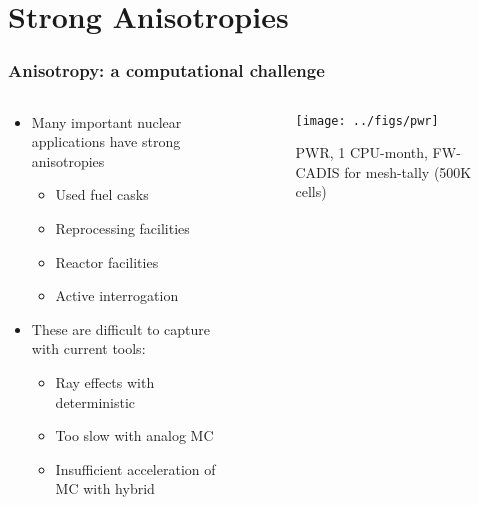 \documentclass[xcolor=x11names,compress]{beamer}
\renewcommand{\(}{\begin{columns}}
\renewcommand{\)}{\end{columns}}
\newcommand{\<}[1]{\begin{column}{#1}}
\renewcommand{\>}{\end{column}}
\begin{document}
\section{Strong Anisotropies}
\begin{frame}[fragile]
  \frametitle{Anisotropy: a computational challenge}

	\begin{columns}
  	\begin{column}{0.5\textwidth}
	\begin{itemize}
	\item Many important nuclear applications have strong anisotropies
	 \begin{itemize}
	 \item Used fuel casks
	 \item Reprocessing facilities
	 \item Reactor facilities
	 \item Active interrogation 
	 \end{itemize}
	\item These are difficult to capture with current tools:
	 \begin{itemize}
	 \item Ray effects with deterministic
	 \item Too slow with analog MC
	 \item Insufficient acceleration of MC with hybrid
	 \end{itemize}
	\end{itemize}
  	\end{column}
 	\begin{column}{0.5\textwidth}
 	 \begin{center}
 	 \begin{figure}
 	 \texttt{[image: ../figs/pwr]}  
 	 \caption{PWR, 1 CPU-month, FW-CADIS  for mesh-tally (500K cells)}
 	 \end{figure}
 	 \end{center}

  	\end{column}
	\end{columns}

\end{frame}
\end{document}
